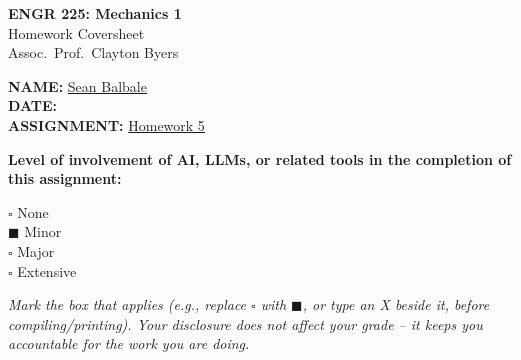 \documentclass[11pt]{article}
\newcommand{\assignmentNumber}{5}
\newcommand{\assignedDate}{16 Oct 2026}
\newcommand{\dueDate}{23 Oct 2026}
\begin{document}
\begin{titlepage}
    \centering
    \vspace*{2cm}
    {\LARGE \bfseries ENGR 225: Mechanics 1} \\[0.3cm]
    {\Large Homework Coversheet} \\[0.3cm]
    {\large Assoc.\ Prof.\ Clayton Byers} \\[2cm]

    \begin{flushleft}
        \Large
        \textbf{NAME:} \underline{\hspace{0.5cm}Sean Balbale\hspace{4.5cm}} \\[1cm]
        \textbf{DATE:} \underline{\hspace{10cm}} \\[1cm]
        \textbf{ASSIGNMENT:} \underline{\hspace{0.5cm}Homework 5\hspace{3.5cm}} \\[2cm]
    \end{flushleft}

    \large
    \textbf{Level of involvement of AI, LLMs, or related tools in the completion of this assignment:}

    \vspace{1cm}

    \begin{flushleft}
        \Large
        $\square$ \quad None \\[0.7cm]
        $\blacksquare$ \quad Minor \\[0.7cm]
        $\square$ \quad Major \\[0.7cm]
        $\square$ \quad Extensive \\[1.5cm]
    \end{flushleft}

    \normalsize
    \textit{Mark the box that applies (e.g., replace $\square$ with $\blacksquare$, or type an X beside it, before compiling/printing). Your disclosure does not affect your grade -- it keeps you accountable for the work you are doing.}

\end{titlepage}

\end{document}
